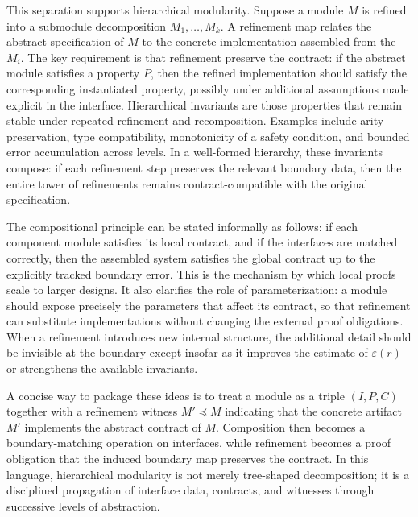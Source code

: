 \documentclass[11pt]{article}
\begin{document}
This separation supports hierarchical modularity. Suppose a module \(M\) is refined into a submodule decomposition \(M_1,\dots,M_k\). A refinement map relates the abstract specification of \(M\) to the concrete implementation assembled from the \(M_i\). The key requirement is that refinement preserve the contract: if the abstract module satisfies a property \(P\), then the refined implementation should satisfy the corresponding instantiated property, possibly under additional assumptions made explicit in the interface. Hierarchical invariants are those properties that remain stable under repeated refinement and recomposition. Examples include arity preservation, type compatibility, monotonicity of a safety condition, and bounded error accumulation across levels. In a well-formed hierarchy, these invariants compose: if each refinement step preserves the relevant boundary data, then the entire tower of refinements remains contract-compatible with the original specification.

The compositional principle can be stated informally as follows: if each component module satisfies its local contract, and if the interfaces are matched correctly, then the assembled system satisfies the global contract up to the explicitly tracked boundary error. This is the mechanism by which local proofs scale to larger designs. It also clarifies the role of parameterization: a module should expose precisely the parameters that affect its contract, so that refinement can substitute implementations without changing the external proof obligations. When a refinement introduces new internal structure, the additional detail should be invisible at the boundary except insofar as it improves the estimate of \(\varepsilon(r)\) or strengthens the available invariants.

A concise way to package these ideas is to treat a module as a triple \((I,P,C)\) together with a refinement witness \(M' \preceq M\) indicating that the concrete artifact \(M'\) implements the abstract contract of \(M\). Composition then becomes a boundary-matching operation on interfaces, while refinement becomes a proof obligation that the induced boundary map preserves the contract. In this language, hierarchical modularity is not merely tree-shaped decomposition; it is a disciplined propagation of interface data, contracts, and witnesses through successive levels of abstraction.
\end{document}
